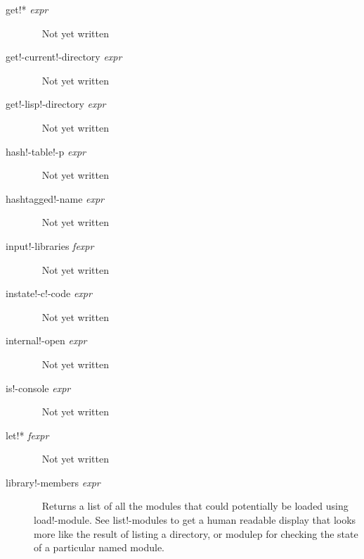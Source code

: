 \documentclass[a4paper,11pt]{article}
\begin{document}
\begin{description}
\item [{\ttfamily get!*} {\itshape  expr}]  ~\newline
Not yet written

\item [{\ttfamily get!-current!-directory} {\itshape  expr}]  ~\newline
Not yet written

\item [{\ttfamily get!-lisp!-directory} {\itshape  expr}]  ~\newline
Not yet written

\item [{\ttfamily hash!-table!-p} {\itshape  expr}]  ~\newline
Not yet written

\item [{\ttfamily hashtagged!-name} {\itshape  expr}]  ~\newline
Not yet written

\item [{\ttfamily input!-libraries} {\itshape  fexpr}]  ~\newline
Not yet written

\item [{\ttfamily instate!-c!-code} {\itshape  expr}]  ~\newline
Not yet written

\item [{\ttfamily internal!-open} {\itshape  expr}]  ~\newline
Not yet written

\item [{\ttfamily is!-console} {\itshape  expr}]  ~\newline
Not yet written

\item [{\ttfamily let!*} {\itshape  fexpr}]  ~\newline
Not yet written

\item [{\ttfamily library!-members} {\itshape  expr}]  ~\newline
Returns a list of all the modules that could potentially be loaded using
{\ttfamily load!-module}. See {\ttfamily list!-modules} to get a human
readable display that looks more like the result of listing a directory, or
{\ttfamily modulep} for checking the state of a particular named module.
  


\end{description}
\end{document}

